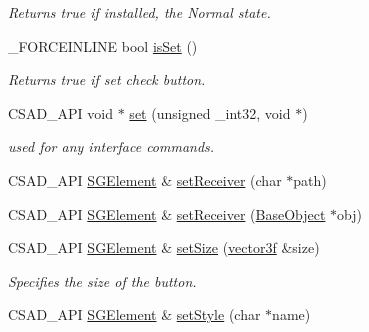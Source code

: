 \begin{DoxyCompactItemize}
\begin{DoxyCompactList}\small\item\em Returns true if installed, the Normal state. \end{DoxyCompactList}\item 
\hypertarget{classcsad_1_1_s_g_element_ad12820b6bf850505ebff3b6b8ce42b95}{\-\_\-\-F\-O\-R\-C\-E\-I\-N\-L\-I\-N\-E bool \hyperlink{classcsad_1_1_s_g_element_ad12820b6bf850505ebff3b6b8ce42b95}{is\-Set} ()}\label{classcsad_1_1_s_g_element_ad12820b6bf850505ebff3b6b8ce42b95}

\begin{DoxyCompactList}\small\item\em Returns true if set check button. \end{DoxyCompactList}\item 
\hypertarget{classcsad_1_1_s_g_element_ae5c8f60b85b7c5193349fd7ffcda7139}{C\-S\-A\-D\-\_\-\-A\-P\-I void $\ast$ \hyperlink{classcsad_1_1_s_g_element_ae5c8f60b85b7c5193349fd7ffcda7139}{set} (unsigned \-\_\-int32, void $\ast$)}\label{classcsad_1_1_s_g_element_ae5c8f60b85b7c5193349fd7ffcda7139}

\begin{DoxyCompactList}\small\item\em used for any interface commands. \end{DoxyCompactList}\item 
C\-S\-A\-D\-\_\-\-A\-P\-I \hyperlink{classcsad_1_1_s_g_element}{S\-G\-Element} \& \hyperlink{classcsad_1_1_s_g_element_a1a8aaf98a4fb6960e00365000b44bff9}{set\-Receiver} (char $\ast$path)
\item 
C\-S\-A\-D\-\_\-\-A\-P\-I \hyperlink{classcsad_1_1_s_g_element}{S\-G\-Element} \& \hyperlink{classcsad_1_1_s_g_element_a907a3e90a07a8fc5e1fb4d56fb79297b}{set\-Receiver} (\hyperlink{classcsad_1_1_base_object}{Base\-Object} $\ast$obj)
\item 
\hypertarget{classcsad_1_1_s_g_element_a2b54c600a0ff84852e464dfa21d909b2}{C\-S\-A\-D\-\_\-\-A\-P\-I \hyperlink{classcsad_1_1_s_g_element}{S\-G\-Element} \& \hyperlink{classcsad_1_1_s_g_element_a2b54c600a0ff84852e464dfa21d909b2}{set\-Size} (\hyperlink{classbt_1_1vector3f}{vector3f} \&size)}\label{classcsad_1_1_s_g_element_a2b54c600a0ff84852e464dfa21d909b2}

\begin{DoxyCompactList}\small\item\em Specifies the size of the button. \end{DoxyCompactList}\item 
\hypertarget{classcsad_1_1_s_g_element_ac6b8f94a11a2521c529ac357ec4e5e57}{C\-S\-A\-D\-\_\-\-A\-P\-I \hyperlink{classcsad_1_1_s_g_element}{S\-G\-Element} \& \hyperlink{classcsad_1_1_s_g_element_ac6b8f94a11a2521c529ac357ec4e5e57}{set\-Style} (char $\ast$name)}\label{classcsad_1_1_s_g_element_ac6b8f94a11a2521c529ac357ec4e5e57}


\end{DoxyCompactItemize}
